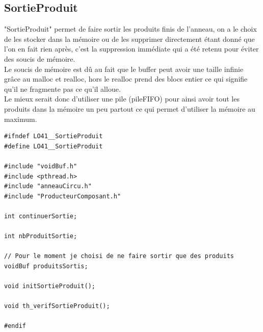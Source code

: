 \documentclass{report}
\begin{document}
\subsection{SortieProduit}
"SortieProduit" permet de faire sortir les produits finis de l'anneau, on a le choix de les stocker dans la mémoire ou de les supprimer directement étant donné que l'on en fait rien après, c'est la suppression immédiate qui a été retenu pour éviter des soucis de mémoire.\\
Le soucis de mémoire est dû au fait que le buffer peut avoir une taille infinie grâce au malloc et realloc, hors le realloc prend des blocs entier ce qui signifie qu'il ne fragmente pas ce qu'il alloue.\\
Le mieux serait donc d'utiliser une pile (pileFIFO) pour ainsi avoir tout les produits dans la mémoire un peu partout ce qui permet d'utiliser la mémoire au maximum.
\begin{lstlisting}[caption=Représentation de la sortie des produits finis]
#ifndef LO41__SortieProduit
#define LO41__SortieProduit

#include "voidBuf.h"
#include <pthread.h>
#include "anneauCircu.h"
#include "ProducteurComposant.h"

int continuerSortie;

int nbProduitSortie;

// Pour le moment je choisi de ne faire sortir que des produits
voidBuf produitsSortis;

void initSortieProduit();

void th_verifSortieProduit();

#endif 
\end{lstlisting}
\end{document}
